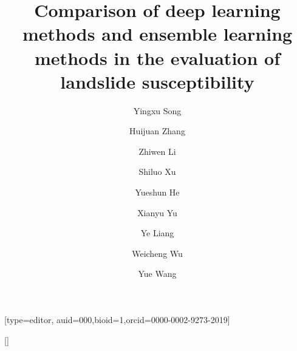 \documentclass[a4paper,fleqn]{cas-sc}
\begin{document}
\let\WriteBookmarks\relax
\def\floatpagepagefraction{1}
\def\textpagefraction{.001}

\title [mode = title]{Comparison of deep learning methods and ensemble learning methods in the evaluation of landslide susceptibility}



\author[1]{Yingxu Song} [type=editor,
auid=000,bioid=1,orcid=0000-0002-9273-2019]

\author[2]{Huijuan Zhang}[]

\author[3]{Zhiwen Li}

\author[4]{Shiluo Xu}

\author[5]{Yueshun He}

\author[7]{Xianyu Yu}

\author[8]{Ye Liang}

\author[1]{Weicheng Wu}

\author[2]{Yue Wang}

\address[1]{School of Earth Sciences, East China University of Technology, Nanchang, Jiangxi Province 330013, China}
\address[2]{Key Lab of Digital Land and Resources and Faculty of Earth Sciences, East China University of Technology, Nanchang, 330013, Jiangxi, China}
\address[3]{Jiangxi Engineering Laboratory on Radioactive Geoscience and Big Data Technology, School of Information and Engineering, East China University of Technology, Nanchang, 330013, Jiangxi, China; yxsong@ecut.edu.cn}
\address[4]{School of Information Engineering, Huzhou University, Huzhou 313000, China; xushiluo@163.com} 
\address[5]{East China University of Technology, Nanchang, 330013, Jiangxi, China; heys@ecut.edu.cn} 
\address[6]{School of Environmental and Chemical Engineering, Foshan University, Foshan, 528000, China; lizw1982@163.com} 
\address[7]{School of Civil Engineering, Architecture and Environment, Hubei University of Technology, Wuhan, Hubei Province 430074, China; yuxianyu@hbut.edu.cn} 
\address[8]{Jiangxi Engineering Technology Research Center of Nuclear Geoscience Data Science and System, East China University of Technology, Nanchang, 330013, Jiangxi, China; liangye@ecut.edu.cn} 
\address[1]{Key Lab of Digital Land and Resources and Faculty of Earth Sciences, East China University of Technology, Nanchang, 330013, Jiangxi, China; wuwch@ecut.edu.cn/wuwc030903@sina.com} 
\address[2]{School of Earth Sciences, East China University of Technology, Nanchang, Jiangxi Province 330013, China; 2020210058@ecut.edu.cn} 
\end{document}
